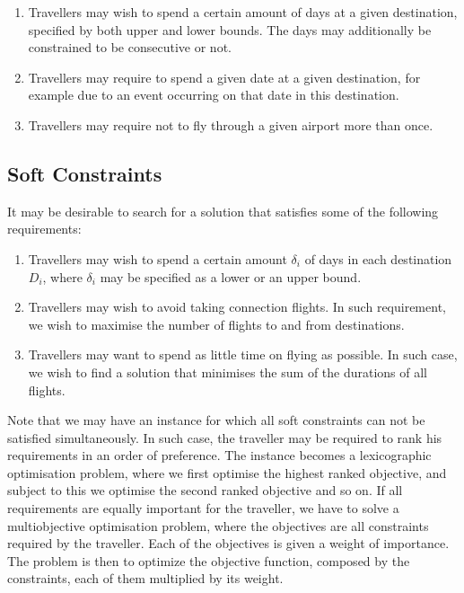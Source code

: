 \documentclass{mprop}
\theoremstyle{definition}
\begin{document}
\begin{enumerate}
\item Travellers may wish to spend a certain amount of days at a given destination, specified by both upper and lower bounds. The days may additionally be constrained to be consecutive or not.

\item Travellers may require to spend a given date at a given destination, for example due to an event occurring on that date in this destination.

\item Travellers may require not to fly through a given airport more than once.
\end{enumerate}

\subsection{Soft Constraints}
\label{subsec:softconstraints}
It may be desirable to search for a solution that satisfies some of the following requirements:

\begin{enumerate}
\item Travellers may wish to spend a certain amount $\delta_{i}$ of days in each destination $D_{i}$, where $\delta_{i}$ may be specified as a lower or an upper bound.

\item Travellers may wish to avoid taking connection flights. In such requirement, we wish to maximise the number of flights to and from destinations.

\item Travellers may want to spend as little time on flying as possible. In such case, we wish to find a solution that minimises the sum of the durations of all flights.
\end{enumerate}

Note that we may have an instance for which all soft constraints can not be satisfied simultaneously. In such case, the traveller may be required to rank his requirements in an order of preference. The instance becomes a lexicographic optimisation problem, where we first optimise the highest ranked objective, and subject to this we optimise the second ranked objective and so on.
If all requirements are equally important for the traveller, we have to solve a multiobjective optimisation problem, where the objectives are all constraints required by the traveller. Each of the objectives is given a weight of importance. The problem is then to optimize the objective function, composed by the constraints, each of them multiplied by its weight. %
\end{document}
